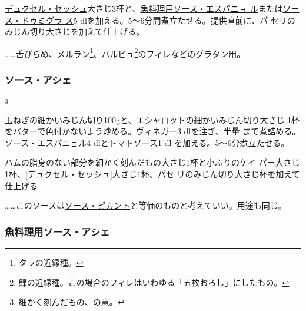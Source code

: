 \begin{recette}
\protect\hyperlink{duxelles-seche}{デュクセル・セッシュ}大さじ3杯と、\protect\hyperlink{sauce-espagnole-maigre}{魚料理用ソース・エスパニョ
ル}または\protect\hyperlink{sauce-demi-glace}{ソース・ドゥミグラ ス}5
dlを加える。5〜6分間煮立たせる。提供直前に、パ
セリのみじん切り大さじ\undemi{}を加えて仕上げる。

\ldots{}\ldots{}舌びらめ、メルラン\footnote{タラの近縁種。}、バルビュ\footnote{鰈の近縁種。この場合のフィレはいわゆる「五枚おろし」にしたもの。}のフィレなどのグラタン用。

\hypertarget{sauce-hachee}{%
\subsubsection{ソース・アシェ}\label{sauce-hachee}}

\footnote{細かく刻んだもの、の意。}


玉ねぎの細かいみじん切り100gと、エシャロットの細かいみじん切り大さじ
1\undemi{}杯をバターで色付かないよう炒める。ヴィネガー3 dlを注ぎ、半量
まで煮詰める。\protect\hyperlink{sauce-espagnole}{ソース・エスパニョル}4
dlと\protect\hyperlink{sauce-tomate}{トマトソース}1\undemi{} dl
を加える。5〜6分煮立たせる。

ハムの脂身のない部分を細かく刻んだもの大さじ1\undemi{}杯と小ぶりのケイ
パー大さじ1\undemi{}杯、{[}デュクセル・セッシュ{]}大さじ1\undemi{}杯、パセ
リのみじん切り大さじ\undemi{}杯を加えて仕上げる

\ldots{}\ldots{}このソースは\protect\hyperlink{sauce-piquante}{ソース・ピカント}と等価のものと考えていい。用途も同じ。

\hypertarget{sauce-hachee-maigre}{%
\subsubsection{魚料理用ソース・アシェ}\label{sauce-hachee-maigre}}




\end{recette}
